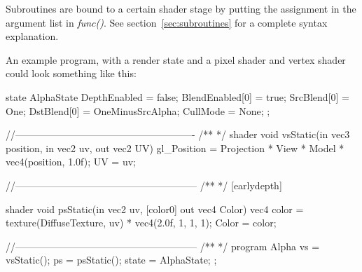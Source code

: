 \documentclass{article}
\begin{document}
Subroutines are bound to a certain shader stage by putting the assignment in the argument list in \textit{func()}. See section~\ref{sec:subroutines} for a complete syntax explanation.

\begin{table}[float]
\caption{Shader dependencies}
\label{table:shaderdeps}
\end{table}

An example program, with a render state and a pixel shader and vertex shader could look something like this:
\begin{CodeBox}
state AlphaState
{
	DepthEnabled = false;
	BlendEnabled[0] = true;
	SrcBlend[0] = One;
	DstBlend[0] = OneMinusSrcAlpha;
	CullMode = None;
};

//-------------------------------------------------------
/**
*/
shader
void
vsStatic(in vec3 position, in vec2 uv, out vec2 UV)
{
	gl_Position = Projection * View * Model * vec4(position, 1.0f);
	UV = uv;
}

//--------------------------------------------------------
/**
*/
[earlydepth]

shader
void 
psStatic(in vec2 uv, [color0] out vec4 Color)
{
	vec4 color = texture(DiffuseTexture, uv) * vec4(2.0f, 1, 1, 1);
	Color =  color;
}

//--------------------------------------------------------
/**
*/
program Alpha
{
	vs = vsStatic();
	ps = psStatic();
	state = AlphaState;
};
\end{CodeBox}
\end{document}
